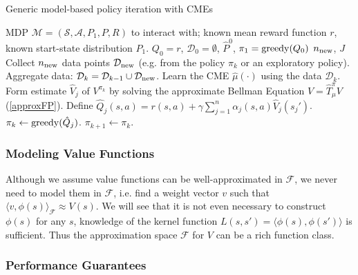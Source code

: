 \documentclass[letterpaper]{article}
\newcommand{\cD}{{\mathcal D}}
\newcommand{\cF}{{\mathcal F}}
\newcommand{\cA}{{\mathcal A}}
\newcommand{\cS}{{\mathcal S}}
\newcommand{\cM}{{\mathcal M}}
\newcommand{\greedy}{\operatornamewithlimits{greedy}}
\newcommand{\lang}{\langle}
\newcommand{\rang}{\rangle}
\begin{document}
\begin{algorithm}[htb]
   \caption{Generic model-based policy iteration with CMEs}
   \label{GenericPolIt}
\begin{algorithmic}
    MDP $\cM = (\cS,\cA,P_1,P,R)$ to interact with; known mean reward function $r$, known start-state distribution $P_1$.
	  $Q_0=r$, $\cD_0 = \emptyset$, $\hat P^0$, $\pi_1 = \greedy(Q_0)$
    $n_{\rm new}$, $J$\\
	  Collect $n_{\rm new}$ data points $\cD_{\rm new}$ (e.g. from the policy $\pi_k$ or an exploratory policy). Aggregate data: $\cD_k = \cD_{k-1}\cup\cD_{\rm new}$.
	  Learn the CME $\hat \mu(\cdot)$ using the data $\cD_k$.
    Form estimate $\hat V_j$ of $V^{\pi_k}$ by solving the approximate Bellman Equation $V =  \hat T^\pi_{\hat \mu} V$ (\ref{approxFP}). Define $\hat Q_j(s,a) = r(s,a) + \gamma \sum_{j=1}^n \alpha_j(s,a) \hat V_j(s_j')$.
	  $\pi_{k} \leftarrow \greedy(\hat Q_j)$. 
   \ENDFOR
	 \STATE $\pi_{k+1} \leftarrow \pi_{k} $.
	\ENDFOR
\end{algorithmic}
\end{algorithm}

\subsubsection{Modeling Value Functions}

Although we assume value functions can be well-approximated in $\cF$, we never need to model them in $\cF$, i.e. find a weight vector $v$ such that $\lang v,\phi(s)\rang_{\cF} \approx V(s)$. We will see that it is not even necessary to construct $\phi(s)$ for any $s$, knowledge of the kernel function $L(s,s') = \lang \phi(s),\phi(s') \rang$ is sufficient. Thus the approximation space $\cF$ for $V$ can be a rich function class.

\subsubsection{Performance Guarantees}\label{PerformanceGuarantees}
\end{document}
